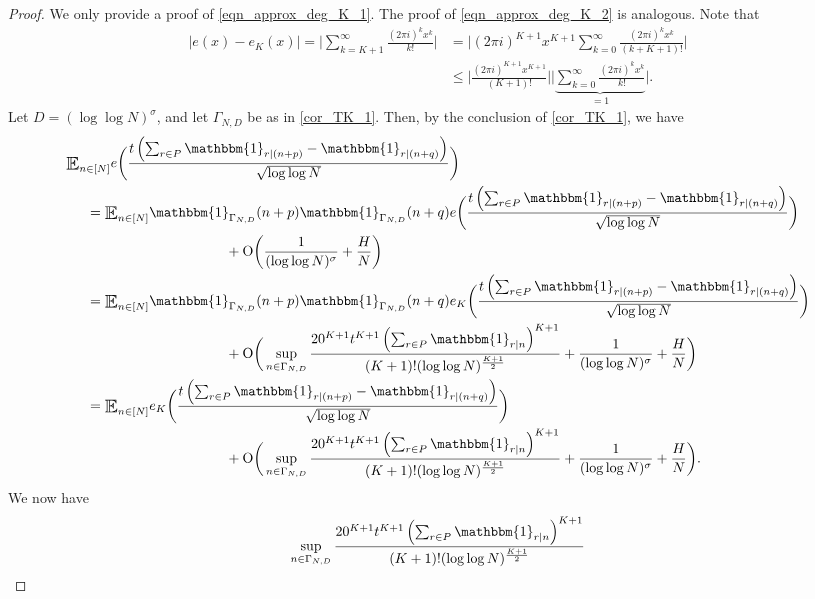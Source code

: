 \documentclass[letter,11pt]{article}
\theoremstyle{plain} %
\theoremstyle{definition} %
\theoremstyle{plain}
\theoremstyle{plain}
\theoremstyle{plain}
\numberwithin{equation}{section}
\newcommand{\Oh}{{\mathrm O}}
\renewcommand{\leq}{\leqslant}
\newcommand{\Esub}[1]{\raisebox{-0.4ex}{\scalebox{1.4}[1.3]{$\mathbb{E}$}}\raisebox{-0.35ex}{\ensuremath{_{\scriptstyle #1}}}}
\newcommand{\1}{\mathbbm{1}}
\begin{document}
\begin{proof}
We only provide a proof of \eqref{eqn_approx_deg_K_1}. The proof of \eqref{eqn_approx_deg_K_2} is analogous. Note that
\begin{align*}
|e(x)-e_K(x)|
=\bigg|\sum_{k=K+1}^\infty \frac{(2\pi i)^k x^k}{k!}\bigg|
& = \bigg|(2\pi i)^{K+1} x^{K+1}\sum_{k=0}^\infty \frac{(2\pi i)^{k} x^{k}}{(k+K+1)!}\bigg|
\\
&\leq \bigg|\frac{(2\pi i)^{K+1} x^{K+1}}{(K+1)!}\bigg| \bigg|\underbrace{\sum_{k=0}^\infty \frac{(2\pi i)^{k} x^{k}}{k!}}_{=1}\bigg|.
\end{align*}
Let $D=(\log\log N)^\sigma$, and let $\Gamma_{N,D}$ be as in \cref{cor_TK_1}. Then, by the conclusion of \cref{cor_TK_1}, we have
\begin{align*}
& \Esub{n\in[N]} e\bigg(\frac{t\left(\sum_{r\in P}\1_{r\mid (n+p)}-\1_{r\mid (n+q)}\right)}{\sqrt{\log\log{N}}}\bigg) 
\\
& \hspace*{.5cm} = \Esub{n\in[N]} \1 _{\Gamma_{N,D}}(n+p)\1 _{\Gamma_{N,D}}(n+q) e\bigg(\frac{t\left(\sum_{r\in P}\1_{r\mid (n+p)}-\1_{r\mid (n+q)}\right)}{\sqrt{\log\log{N}}}\bigg) \\
& \hspace*{4cm} + \Oh\bigg(\frac{1}{(\log\log N)^\sigma}+\frac{H}{N}\bigg)
\\
& \hspace*{.5cm} = \Esub{n\in[N]} \1 _{\Gamma_{N,D}}(n+p)\1 _{\Gamma_{N,D}}(n+q) e_K\bigg(\frac{t\left(\sum_{r\in P}\1_{r\mid (n+p)}-\1_{r\mid (n+q)}\right)}{\sqrt{\log\log{N}}}\bigg)
\\
& \hspace*{4cm} + \Oh\bigg(\sup_{n\in \Gamma_{N,D}} \frac{20^{K+1} t^{K+1} \left(\sum_{r\in P}\1_{r\mid n}\right)^{K+1} }{(K+1)!(\log\log N)^{\frac{K+1}{2}}} +\frac{1}{(\log\log N)^\sigma}+\frac{H}{N}\bigg)
\\
& \hspace*{.5cm} = \Esub{n\in[N]}  e_K\bigg(\frac{t\left(\sum_{r\in P}\1_{r\mid (n+p)}-\1_{r\mid (n+q)}\right)}{\sqrt{\log\log{N}}}\bigg)
\\
&\hspace*{4cm} + \Oh\bigg(\sup_{n\in \Gamma_{N,D}} \frac{20^{K+1} t^{K+1} \left(\sum_{r\in P}\1_{r\mid n}\right)^{K+1} }{(K+1)!(\log\log N)^{\frac{K+1}{2}}} +\frac{1}{(\log\log N)^\sigma}+\frac{H}{N}\bigg).
\end{align*}
We now have
\begin{align*}
\sup_{n\in \Gamma_{N,D}} \frac{20^{K+1} t^{K+1} \left(\sum_{r\in P}\1_{r\mid n}\right)^{K+1} }{(K+1)!(\log\log N)^{\frac{K+1}{2}}} 

\end{align*}
\end{proof}
\end{document}
